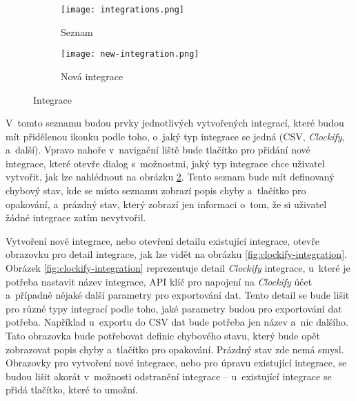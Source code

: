 \begin{figure}[h]
    \centering
    \begin{subfigure}[b]{0.4\textwidth}
		\centering
		\texttt{[image: integrations.png]}
		\caption{Seznam}
		\label{fig:integration-list}
	\end{subfigure}
	\hspace{2cm}
	\begin{subfigure}[b]{0.4\textwidth}
		\centering
		\texttt{[image: new-integration.png]}
		\caption{Nová integrace}
		\label{fig:new-integration}
	\end{subfigure}
	\caption{Integrace}
	\label{fig:integrations}
\end{figure}

V~tomto seznamu budou prvky jednotlivých vytvořených integrací, které budou mít přidělenou ikonku podle toho, o~jaký typ integrace se jedná (CSV, \emph{Clockify}, a~další). Vpravo nahoře v~navigační liště bude tlačítko pro přidání nové integrace, které otevře dialog s~možnostmi, jaký typ integrace chce uživatel vytvořit, jak lze nahlédnout na obrázku \ref{fig:new-integration}. Tento seznam bude mít definovaný chybový stav, kde se místo seznamu zobrazí popis chyby a~tlačítko pro opakování, a~prázdný stav, který zobrazí jen informaci o~tom, že si uživatel žádné integrace zatím nevytvořil.

Vytvoření nové integrace, nebo otevření detailu existující integrace, otevře obrazovku pro detail integrace, jak lze vidět na obrázku \ref{fig:clockify-integration}. Obrázek \ref{fig:clockify-integration} reprezentuje detail \emph{Clockify} integrace, u~které je potřeba nastavit název integrace, API klíč pro napojení na \emph{Clockify} účet a~případně nějaké další parametry pro exportování dat. Tento detail se bude lišit pro různé typy integrací podle toho, jaké parametry budou pro exportování dat potřeba. Například u~exportu do CSV dat bude potřeba jen název a~nic dalšího. Tato obrazovka bude potřebovat definic chybového stavu, který bude opět zobrazovat popis chyby a~tlačítko pro opakování. Prázdný stav zde nemá smysl. Obrazovky pro vytvoření nové integrace, nebo pro úpravu existující integrace, se budou lišit akorát v~možnosti odstranění integrace – u~existující integrace se přidá tlačítko, které to umožní.


